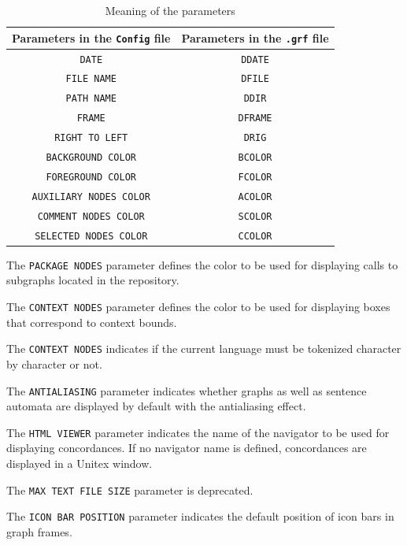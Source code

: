 \begin{table}[h]
\begin{center}
\begin{tabular}{|c|c|}
\hline
Parameters in the \verb+Config+ file &  Parameters in the \verb+.grf+ file
\\
\hline
\verb$DATE$ & \verb$DDATE$
\\
\hline
\verb$FILE NAME$ & \verb$DFILE$
\\
\hline
\verb$PATH NAME$ & \verb$DDIR$
\\
\hline
\verb$FRAME$ & \verb$DFRAME$
\\
\hline
\verb$RIGHT TO LEFT$ & \verb$DRIG$
\\
\hline
\verb$BACKGROUND COLOR$ & \verb$BCOLOR$
\\
\hline
\verb$FOREGROUND COLOR$ & \verb$FCOLOR$
\\
\hline
\verb$AUXILIARY NODES COLOR$ & \verb$ACOLOR$
\\
\hline
\verb$COMMENT NODES COLOR$ & \verb$SCOLOR$
\\
\hline
\verb$SELECTED NODES COLOR$ & \verb$CCOLOR$
\\
\hline
\end{tabular}
\caption{Meaning of the parameters\label{tab-parameters}}
\end{center}
\end{table}

\bigskip
\noindent The \verb+PACKAGE NODES+ parameter defines the color to be used for
displaying calls to subgraphs located in the repository.

\bigskip
\noindent The \verb+CONTEXT NODES+ parameter defines the color to be used for
displaying boxes that correspond to context bounds.

\bigskip
\noindent The \verb+CONTEXT NODES+ indicates if the current language must be
tokenized character by character or not.

\bigskip
\noindent The \verb+ANTIALIASING+ parameter indicates whether graphs as well as
sentence automata are displayed by default with the antialiasing effect.

\bigskip
\noindent The \verb+HTML VIEWER+ parameter indicates the name of the navigator to
be used for displaying concordances. If no navigator name is defined,
concordances are displayed in a Unitex window.

\bigskip
\noindent The \verb+MAX TEXT FILE SIZE+ parameter is deprecated.

\bigskip
\noindent The \verb+ICON BAR POSITION+ parameter indicates the default position of
icon bars in graph frames.

